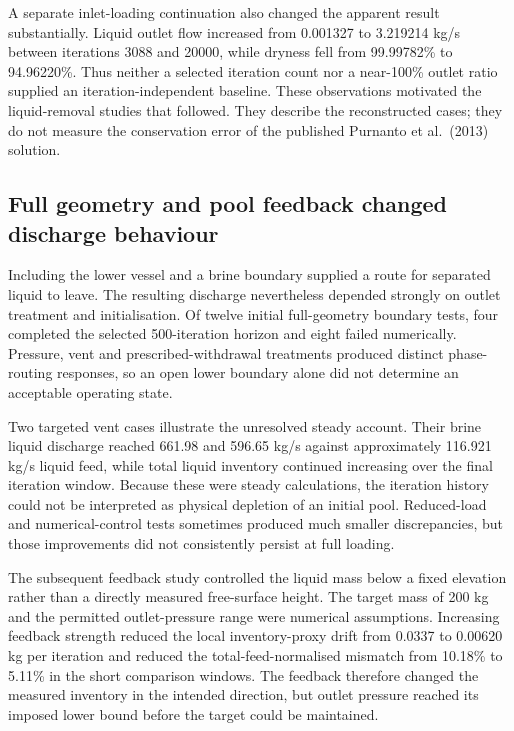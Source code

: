 A separate inlet-loading continuation also changed the apparent result substantially. Liquid outlet flow increased from 0.001327 to 3.219214 kg/s between iterations 3088 and 20000, while dryness fell from 99.99782\% to 94.96220\%. Thus neither a selected iteration count nor a near-100\% outlet ratio supplied an iteration-independent baseline. These observations motivated the liquid-removal studies that followed. They describe the reconstructed cases; they do not measure the conservation error of the published Purnanto et al.~(2013) solution.

\subsection{Full geometry and pool feedback changed discharge behaviour}

Including the lower vessel and a brine boundary supplied a route for separated liquid to leave. The resulting discharge nevertheless depended strongly on outlet treatment and initialisation. Of twelve initial full-geometry boundary tests, four completed the selected 500-iteration horizon and eight failed numerically. Pressure, vent and prescribed-withdrawal treatments produced distinct phase-routing responses, so an open lower boundary alone did not determine an acceptable operating state.

Two targeted vent cases illustrate the unresolved steady account. Their brine liquid discharge reached 661.98 and 596.65 kg/s against approximately 116.921 kg/s liquid feed, while total liquid inventory continued increasing over the final iteration window. Because these were steady calculations, the iteration history could not be interpreted as physical depletion of an initial pool. Reduced-load and numerical-control tests sometimes produced much smaller discrepancies, but those improvements did not consistently persist at full loading.

The subsequent feedback study controlled the liquid mass below a fixed elevation rather than a directly measured free-surface height. The target mass of 200 kg and the permitted outlet-pressure range were numerical assumptions. Increasing feedback strength reduced the local inventory-proxy drift from 0.0337 to 0.00620 kg per iteration and reduced the total-feed-normalised mismatch from 10.18\% to 5.11\% in the short comparison windows. The feedback therefore changed the measured inventory in the intended direction, but outlet pressure reached its imposed lower bound before the target could be maintained.

